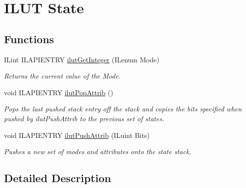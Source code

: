 \hypertarget{group__ilut__state}{\section{I\+L\+U\+T State}
\label{group__ilut__state}
}
\subsection*{Functions}
\begin{DoxyCompactItemize}
\item 
I\+Lint I\+L\+A\+P\+I\+E\+N\+T\+R\+Y \hyperlink{group__ilut__state_ga239431131fb8f750ce210c7546d0d035}{ilut\+Get\+Integer} (I\+Lenum Mode)
\begin{DoxyCompactList}\small\item\em Returns the current value of the {\itshape Mode}. \end{DoxyCompactList}\item 
\hypertarget{group__ilut__state_gae638fbd9224912d86a1d2499166295bb}{void I\+L\+A\+P\+I\+E\+N\+T\+R\+Y \hyperlink{group__ilut__state_gae638fbd9224912d86a1d2499166295bb}{ilut\+Pop\+Attrib} ()}\label{group__ilut__state_gae638fbd9224912d86a1d2499166295bb}

\begin{DoxyCompactList}\small\item\em Pops the last pushed stack entry off the stack and copies the bits specified when pushed by ilut\+Push\+Attrib to the previous set of states. \end{DoxyCompactList}\item 
void I\+L\+A\+P\+I\+E\+N\+T\+R\+Y \hyperlink{group__ilut__state_gac630c7a042dd4ce6840c7e65bd48901d}{ilut\+Push\+Attrib} (I\+Luint Bits)
\begin{DoxyCompactList}\small\item\em Pushes a new set of modes and attributes onto the state stack. \end{DoxyCompactList}\end{DoxyCompactItemize}


\subsection{Detailed Description}


